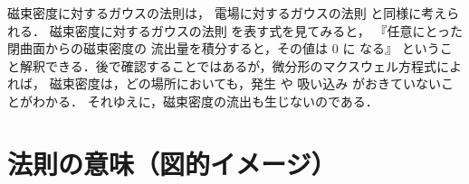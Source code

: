             磁束密度に対するガウスの法則は，
            電場に対するガウスの法則
            と同様に考えられる．
            磁束密度に対するガウスの法則
            を表す式を見てみると，
            『任意にとった閉曲面からの磁束密度の
            流出量を積分すると，その値は 0 に
            なる』
            ということ解釈できる．後で確認することではあるが，微分形のマクスウェル方程式によれば，
            磁束密度は，どの場所においても，発生 や 吸い込み がおきていないことがわかる．
            それゆえに，磁束密度の流出も生じないのである．


    \section{法則の意味（図的イメージ）}
